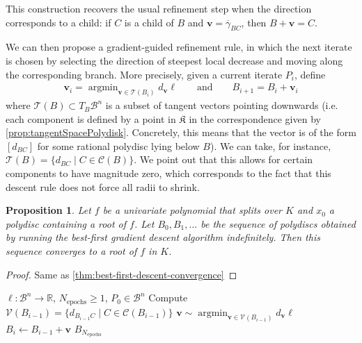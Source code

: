 \documentclass[10pt]{article}
\newtheorem{proposition}[theorem]{Proposition}
\theoremstyle{definition}
\newcommand{\RR}{\mathbb{R}}
\DeclareMathOperator*{\argmin}{\text{argmin}}
\renewcommand{\vec}[1]{\mathbf{#1}}
\begin{document}
This construction recovers the usual refinement step when the direction corresponds to a child: if $C$ is a child of $B$ and $\vec{v} = \overline\gamma_{BC}$, then $B + \vec v = C$.

We can then propose a gradient-guided refinement rule, in which the next iterate is chosen by selecting the direction of steepest local decrease and moving along the corresponding branch. More precisely, given a current iterate \(P_i\), define
\begin{align*}
    \vec v_i = \argmin_{\vec v \in \mathcal{T}(B_i)} d_{\vec{v}} \ell \qquad\text{and}\qquad
    B_{i + 1} = B_i + \vec v_i
\end{align*}
where $\mathcal{T}(B) \subset T_B \mathcal{B}^n$ is a subset of tangent vectors pointing downwards (i.e. each component is defined by a point in $\mathfrak K$ in the correspondence given by \cref{prop:tangentSpacePolydisk}. Concretely, this means that the vector is of the form $[d_{BC}]$ for some rational polydisc lying below $B$). We can take, for instance, $\mathcal{T}(B) = \{ d_{BC} \mid C \in \mathcal{C}(B)\}$. 
We point out that this allows for certain components to have magnitude zero, which corresponds to the fact that this descent rule does not force all radii to shrink.

\begin{proposition}\label{thm:best-first-gradient-descent-convergence}
    Let $f$ be a univariate polynomial that splits over $K$ and $x_0$ a polydisc containing a root of $f$. Let $B_0, B_1, \dotsc$ be the sequence of polydiscs obtained by running the best-first gradient descent algorithm indefinitely. Then this sequence converges to a root of $f$ in $K$.
\end{proposition}
\begin{proof}
    Same as \cref{thm:best-first-descent-convergence}
\end{proof}

\begin{algorithm}[H]
  \begin{algorithmic}[1]
    \Require $\ell\colon \mathcal{B}^n \to \RR$, $N_\mathrm{epochs} \ge 1$, $P_0 \in \mathcal{B}^n$
      \State Compute $\mathcal{V}(B_{i-1}) = \{d_{B_{i-1}C} \mid C \in \mathcal{C}(B_{i-1})\}$ 
      \State $\vec{v} \sim \argmin_{\vec{v} \in \mathcal{V}(B_{i-1})} d_{\vec{v}}\ell$ 
      \State $B_i \gets B_{i-1} +\vec{v}$
    \EndFor
  \Return $B_{N_\mathrm{epochs}}$
  \end{algorithmic}
  \caption{Best-First Gradient Descent}
  \label{alg:best-first-gradient-search}
\end{algorithm}
\end{document}
